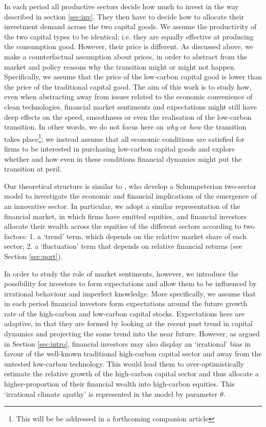 \documentclass[authoryear]{article}
\begin{document}
In each period all productive sectors decide how much to invest in the way described in section \ref{sec:inv}. They then have to decide how to allocate their investment demand across the two capital goods. We assume the productivity of the two capital types to be identical; i.e. they are equally effective at producing the consumption good. However, their price is different. As discussed above, we make a counterfactual assumption about prices, in order to abstract from the market and policy reasons why the transition might or might not happen. Specifically, we assume that the price of the low-carbon capital good is lower than the price of the traditional capital good. The aim of this work is  to study how, even when abstracting away from issues related to the economic convenience of clean technologies, financial market sentiments and expectations might still have deep effects on the speed, smoothness or even the realisation of the low-carbon transition. In other words, we do not focus here on \emph{why} or \emph{how} the transition takes place\footnote{This will be be addressed in a forthcoming companion article}; we instead assume that all economic conditions are satisfied for firms to be interested in purchasing low-carbon capital goods and explore whether and how even in these conditions financial dynamics might put the transition at peril.

Our  theoretical structure is similar to \citet{Caiani2014}, who develop a Schumpeterian two-sector model to investigate the economic and financial implications of the emergence of an innovative sector. In particular, we adopt a similar representation of the financial market, in which firms have emitted equities, and financial investors allocate their wealth across the equities of the different sectors according to two factors: 1. a `trend' term, which depends on the relative market share of each sector; 2. a `fluctuation' term that depends on relative financial returns (see Section \ref{sec:port}). 

In order to study the role of market sentiments, however, we introduce the possibility for investors to form expectations and allow them to be influenced by irrational behaviour and imperfect knowledge. More specifically, we assume that in each period financial investors form expectations around the future growth rate of the high-carbon and low-carbon capital stocks. Expectations here are adaptive, in that they are formed by looking at the recent past trend in capital dynamics and projecting the same trend into the near future. However, as argued in Section \ref{sec:intro}, financial investors may also display an `irrational' bias in favour of the well-known traditional high-carbon capital sector and away from the untested low-carbon technology. This would lead them to over-optimistically estimate the relative growth of the high-carbon capital sector and thus allocate a higher-proportion of their financial wealth into high-carbon equities. This `irrational climate apathy' is represented in the model by parameter $\theta$. 
\end{document}
